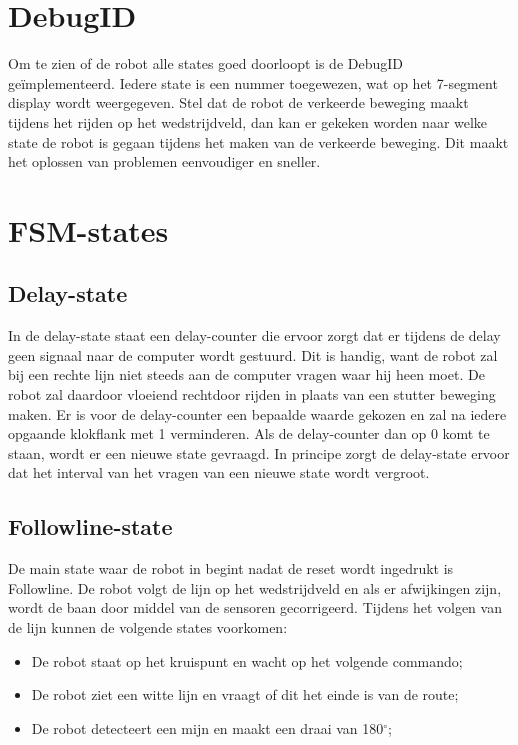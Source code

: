 \documentclass{report}
\begin{document}
\section{DebugID}
Om te zien of de robot alle states goed doorloopt is de DebugID ge\"{i}mplementeerd. Iedere state is een nummer toegewezen, wat op het 7-segment display wordt weergegeven. Stel dat de robot de verkeerde beweging maakt tijdens het rijden op het wedstrijdveld, dan kan er gekeken worden naar welke state de robot is gegaan tijdens het maken van de verkeerde beweging. Dit maakt het oplossen van problemen eenvoudiger en sneller. 

\section{FSM-states}

\subsection{Delay-state}
In de delay-state staat een delay-counter die ervoor zorgt dat er tijdens de delay geen signaal naar de computer wordt gestuurd. Dit is handig, want de robot zal bij een rechte lijn niet steeds aan de computer vragen waar hij heen moet. De robot zal daardoor vloeiend rechtdoor rijden in plaats van een stutter beweging maken. Er is voor de delay-counter een bepaalde waarde gekozen en zal na iedere opgaande klokflank met 1 verminderen. Als de delay-counter dan op 0 komt te staan, wordt er een nieuwe state gevraagd. In principe zorgt de delay-state ervoor dat het interval van het vragen van een nieuwe state wordt vergroot. 

\subsection{Followline-state}
De main state waar de robot in begint nadat de reset wordt ingedrukt is Followline. De robot volgt de lijn op het wedstrijdveld en als er afwijkingen zijn, wordt de baan door middel van de sensoren gecorrigeerd. Tijdens het volgen van de lijn kunnen de volgende states voorkomen: 
\begin{itemize}
\item De robot staat op het kruispunt en wacht op het volgende commando;
\item De robot ziet een witte lijn en vraagt of dit het einde is van de route;
\item De robot detecteert een mijn en maakt een draai van 180$^\circ$;
\end{itemize}
\end{document}
